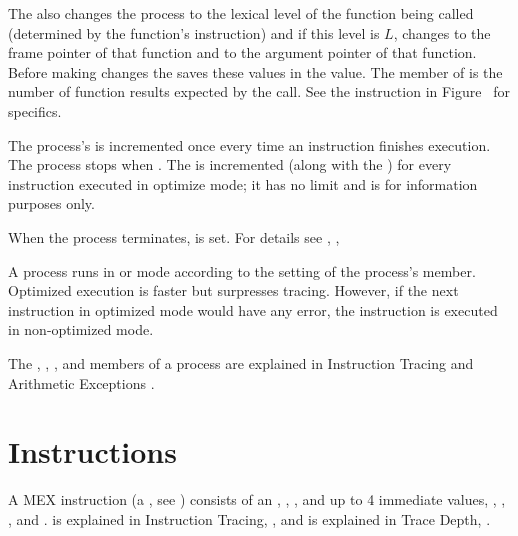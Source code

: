 \documentclass[12pt]{article}
\begin{document}
The  also changes the process  to the lexical level
of the function being called (determined by the function's 
instruction) and if this level is $L$, changes  to the
frame pointer of that function and  to the argument pointer
of that function.  Before making changes the 
saves these values in the  value.
The  member of 
is the number of function results expected by the call.
See the  instruction in
Figure~
for specifics.

The process's  is incremented once every time an instruction
finishes execution.  The process stops when
\label{COUNTER-LIMIT}.
The 
is incremented (along with the )
for every instruction executed in optimize mode;
it has no limit and is for information purposes only.

When the process terminates,  is set.  For details
see , ,

A process runs in  or  mode
according to the setting of the process's  member.
Optimized execution is faster but surpresses tracing.
However, if the next instruction in optimized mode would have
any error, the instruction is executed in non-optimized mode.

The , , , and
members of a process
are explained in
Instruction Tracing 
and Arithmetic Exceptions .


\section{Instructions}
\label{INSTRUCTIONS}

A MEX instruction (a , see )
consists of an , , ,
and up to 4 immediate values,
, , , and .
 is explained in Instruction Tracing,
, and
 is explained in Trace Depth,
.
\end{document}
